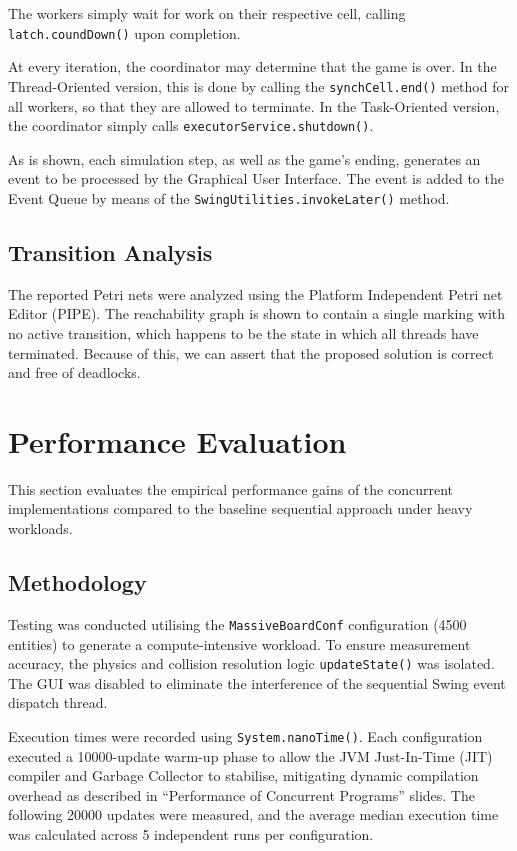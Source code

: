 \documentclass{scrartcl}
\begin{document}
The workers simply wait for work on their respective cell, calling \texttt{latch.coundDown()} upon completion.

At every iteration, the coordinator may determine that the game is over. In the Thread-Oriented version, this is done by calling the \texttt{synchCell.end()} method for all workers, so that they are allowed to terminate. In the Task-Oriented version, the coordinator simply calls \texttt{executorService.shutdown()}.

As is shown, each simulation step, as well as the game's ending, generates an event to be processed by the Graphical User Interface. The event is added to the Event Queue by means of the \texttt{SwingUtilities.invokeLater()} method.

\subsection{Transition Analysis}
The reported Petri nets were analyzed using the Platform Independent Petri net Editor (PIPE). The reachability graph is shown to contain a single marking with no active transition, which happens to be the state in which all threads have terminated. Because of this, we can assert that the proposed solution is correct and free of deadlocks.

\section{Performance Evaluation}
This section evaluates the empirical performance gains of the concurrent implementations compared to the baseline sequential approach under heavy workloads.

\subsection{Methodology}
Testing was conducted utilising the \texttt{MassiveBoardConf} configuration (4500 entities) to generate a compute-intensive workload. To ensure measurement accuracy, the physics and collision resolution logic \texttt{updateState()} was isolated. The GUI was disabled to eliminate the interference of the sequential Swing event dispatch thread.

Execution times were recorded using \texttt{System.nanoTime()}. Each configuration executed a 10000-update warm-up phase to allow the JVM Just-In-Time (JIT) compiler and Garbage Collector to stabilise, mitigating dynamic compilation overhead as described in ``Performance of Concurrent Programs'' slides. The following 20000 updates were measured, and the average median execution time was calculated across 5 independent runs per configuration.
\end{document}
